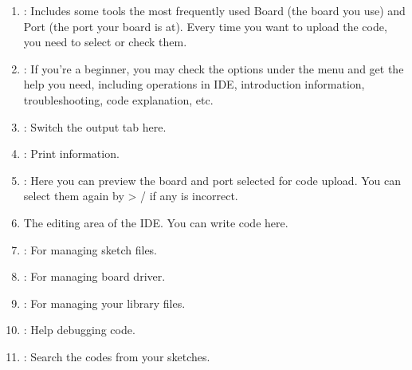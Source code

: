 \documentclass[a4paper,11pt,english]{sphinxmanual}
\begin{document}
\begin{enumerate}
\item {} 
\sphinxAtStartPar
{}: Includes some tools \textendash{} the most frequently used Board (the board you use) and Port (the port your board is at). Every time you want to upload the code, you need to select or check them.

\item {} 
\sphinxAtStartPar
{}: If you’re a beginner, you may check the options under the menu and get the help you need, including operations in IDE, introduction information, troubleshooting, code explanation, etc.

\item {} 
\sphinxAtStartPar
{}: Switch the output tab here.

\item {} 
\sphinxAtStartPar
{}: Print information.

\item {} 
\sphinxAtStartPar
{}: Here you can preview the board and port selected for code upload. You can select them again by  \sphinxhyphen{}\textgreater{}  /  if any is incorrect.

\item {} 
\sphinxAtStartPar
The editing area of the IDE. You can write code here.

\item {} 
\sphinxAtStartPar
{}: For managing sketch files.

\item {} 
\sphinxAtStartPar
{}: For managing board driver.

\item {} 
\sphinxAtStartPar
{}: For managing your library files.

\item {} 
\sphinxAtStartPar
{}: Help debugging code.

\item {} 
\sphinxAtStartPar
{}: Search the codes from your sketches.

\end{enumerate}
\end{document}
